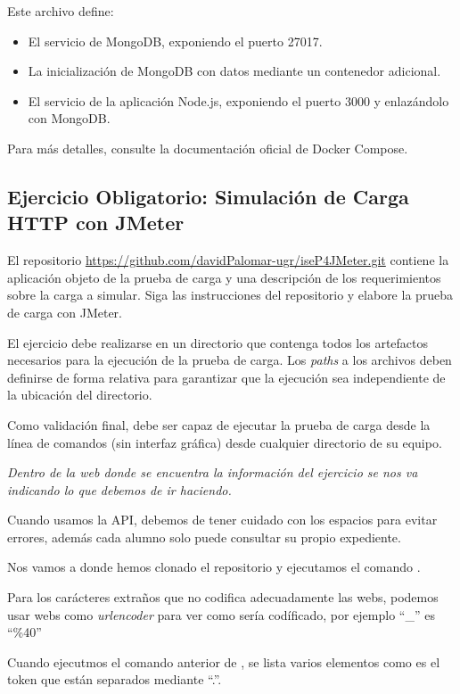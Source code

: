 Este archivo define:
\begin{itemize}
    \item El servicio de MongoDB, exponiendo el puerto 27017.
    \item La inicialización de MongoDB con datos mediante un contenedor adicional.
    \item El servicio de la aplicación Node.js, exponiendo el puerto 3000 y enlazándolo con MongoDB.
\end{itemize}

Para más detalles, consulte la documentación oficial de Docker Compose.

\subsection*{Ejercicio Obligatorio: Simulación de Carga HTTP con JMeter}

El repositorio \url{https://github.com/davidPalomar-ugr/iseP4JMeter.git} contiene la aplicación objeto de la prueba de carga y una descripción de los requerimientos sobre la carga a simular. Siga las instrucciones del repositorio y elabore la prueba de carga con JMeter.

El ejercicio debe realizarse en un directorio que contenga todos los artefactos necesarios para la ejecución de la prueba de carga. Los \textit{paths} a los archivos deben definirse de forma relativa para garantizar que la ejecución sea independiente de la ubicación del directorio. 

Como validación final, debe ser capaz de ejecutar la prueba de carga desde la línea de comandos (sin interfaz gráfica) desde cualquier directorio de su equipo.

\textit{Dentro de la web donde se encuentra la información del ejercicio se nos va indicando lo que debemos de ir haciendo.}

Cuando usamos la API, debemos de tener cuidado con los espacios para evitar errores, además cada alumno solo puede consultar su propio expediente.

Nos vamos a donde hemos clonado el repositorio y ejecutamos el comando . 

Para los carácteres extraños que no codifica adecuadamente las webs, podemos usar webs como \textit{urlencoder} para ver como sería codíficado, por ejemplo ``\_'' es ``\%40''

Cuando ejecutmos el comando anterior de , se lista varios elementos como es el token que están separados mediante ``.''.

